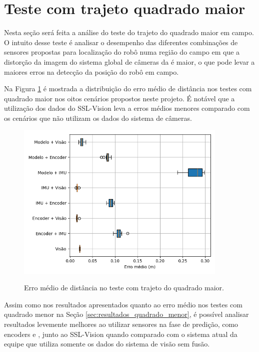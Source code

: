 \documentclass[acronym, symbols, table]{fei}
\begin{document}
	\section{Teste com trajeto quadrado maior} \label{sec:resultados_quadrado_maior}
	
		Nesta seção será feita a análise do teste do trajeto do quadrado maior em campo. O intuito desse teste é analisar o desempenho das diferentes combinações de sensores propostas para localização do robô numa região do campo em que a distorção da imagem do sistema global de câmeras da  é maior, o que pode levar a maiores erros na detecção da posição do robô em campo.
		
		Na Figura \ref{fig:erro_medio_distancia_quad_maior} é mostrada a distribuição do erro médio de distância nos testes com quadrado maior nos oitos cenários propostos neste projeto. É notável que a utilização dos dados do SSL-Vision leva a erros médios menores comparado com os cenários que não utilizam os dados do sistema de câmeras.
		
		\begin{figure}[!htb]
			\centering
			\caption{Erro médio de distância no teste com trajeto do quadrado maior.}
			\includegraphics[width=0.9\textwidth]{../Dados/Graficos-Resultados/erro_medio_distancia_quadrado_maior.png}
			\label{fig:erro_medio_distancia_quad_maior}
		\end{figure}
	
		Assim como nos resultados apresentados quanto ao erro médio nos testes com quadrado menor na Seção \ref{sec:resultados_quadrado_menor}, é possível analisar resultados levemente melhores ao utilizar sensores na fase de predição, como encoders e , junto ao SSL-Vision quando comparado com o sistema atual da equipe que utiliza somente os dados do sistema de visão sem fusão.
	
\end{document}
